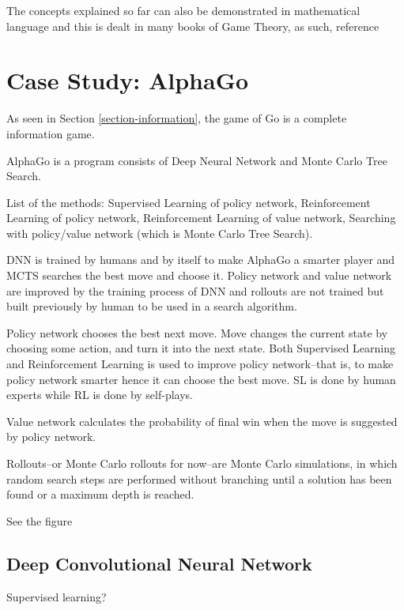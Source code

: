 \documentclass[11pt]{article}
\begin{document}
	
	
	The concepts explained so far can also be demonstrated in mathematical language and this is dealt in many books of Game Theory, as such, reference~~%
	
	
	\section{Case Study: AlphaGo}\label{section-alphago}
	As seen in Section \ref{section-information}, the game of Go is a complete information game.
	
	AlphaGo is a program consists of Deep Neural Network and Monte Carlo Tree Search. 
	
	List of the methods: Supervised Learning of policy network, Reinforcement Learning of policy network, Reinforcement Learning of value network, Searching with policy/value network (which is Monte Carlo Tree Search).
	
	DNN is trained by humans and by itself to make AlphaGo a smarter player and MCTS searches the best move and choose it. Policy network and value network are improved by the training process of DNN and rollouts are not trained but built previously by human to be used in a search algorithm. %

	Policy network chooses the best next move. Move changes the current state by choosing some action, and turn it into the next state. Both Supervised Learning and Reinforcement Learning is used to improve policy network--that is, to make policy network smarter hence it can choose the best move. SL is done by human experts while RL is done by self-plays.
	
	Value network calculates the probability of final win when the move is suggested by policy network.
	
	Rollouts--or Monte Carlo rollouts for now--are Monte Carlo simulations, in which random search steps are performed without branching until a solution has been found or a maximum depth is reached.
	
	
	See the figure %
	
	
	
	\subsection{Deep Convolutional Neural Network}
	Supervised learning?
	
\end{document}
